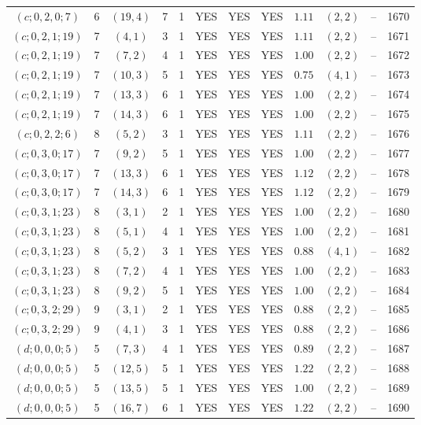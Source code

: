 \begin{longtable}{|c|c|c|c|c|c|c|c|c|c|c|c|}
$(c;0,2,0;7)$ & 6 & $(19,4)$ & 7 & 1 & YES & YES & YES & $1.11$ & $(2,2)$ & -- & 1670\\
$(c;0,2,1;19)$ & 7 & $(4,1)$ & 3 & 1 & YES & YES & YES & $1.11$ & $(2,2)$ & -- & 1671\\
$(c;0,2,1;19)$ & 7 & $(7,2)$ & 4 & 1 & YES & YES & YES & $1.00$ & $(2,2)$ & -- & 1672\\
$(c;0,2,1;19)$ & 7 & $(10,3)$ & 5 & 1 & YES & YES & YES & $0.75$ & $(4,1)$ & -- & 1673\\
$(c;0,2,1;19)$ & 7 & $(13,3)$ & 6 & 1 & YES & YES & YES & $1.00$ & $(2,2)$ & -- & 1674\\
$(c;0,2,1;19)$ & 7 & $(14,3)$ & 6 & 1 & YES & YES & YES & $1.00$ & $(2,2)$ & -- & 1675\\
$(c;0,2,2;6)$ & 8 & $(5,2)$ & 3 & 1 & YES & YES & YES & $1.11$ & $(2,2)$ & -- & 1676\\
$(c;0,3,0;17)$ & 7 & $(9,2)$ & 5 & 1 & YES & YES & YES & $1.00$ & $(2,2)$ & -- & 1677\\
$(c;0,3,0;17)$ & 7 & $(13,3)$ & 6 & 1 & YES & YES & YES & $1.12$ & $(2,2)$ & -- & 1678\\
$(c;0,3,0;17)$ & 7 & $(14,3)$ & 6 & 1 & YES & YES & YES & $1.12$ & $(2,2)$ & -- & 1679\\
$(c;0,3,1;23)$ & 8 & $(3,1)$ & 2 & 1 & YES & YES & YES & $1.00$ & $(2,2)$ & -- & 1680\\
$(c;0,3,1;23)$ & 8 & $(5,1)$ & 4 & 1 & YES & YES & YES & $1.00$ & $(2,2)$ & -- & 1681\\
$(c;0,3,1;23)$ & 8 & $(5,2)$ & 3 & 1 & YES & YES & YES & $0.88$ & $(4,1)$ & -- & 1682\\
$(c;0,3,1;23)$ & 8 & $(7,2)$ & 4 & 1 & YES & YES & YES & $1.00$ & $(2,2)$ & -- & 1683\\
$(c;0,3,1;23)$ & 8 & $(9,2)$ & 5 & 1 & YES & YES & YES & $1.00$ & $(2,2)$ & -- & 1684\\
$(c;0,3,2;29)$ & 9 & $(3,1)$ & 2 & 1 & YES & YES & YES & $0.88$ & $(2,2)$ & -- & 1685\\
$(c;0,3,2;29)$ & 9 & $(4,1)$ & 3 & 1 & YES & YES & YES & $0.88$ & $(2,2)$ & -- & 1686\\
$(d;0,0,0;5)$ & 5 & $(7,3)$ & 4 & 1 & YES & YES & YES & $0.89$ & $(2,2)$ & -- & 1687\\
$(d;0,0,0;5)$ & 5 & $(12,5)$ & 5 & 1 & YES & YES & YES & $1.22$ & $(2,2)$ & -- & 1688\\
$(d;0,0,0;5)$ & 5 & $(13,5)$ & 5 & 1 & YES & YES & YES & $1.00$ & $(2,2)$ & -- & 1689\\
$(d;0,0,0;5)$ & 5 & $(16,7)$ & 6 & 1 & YES & YES & YES & $1.22$ & $(2,2)$ & -- & 1690\\

\end{longtable}
